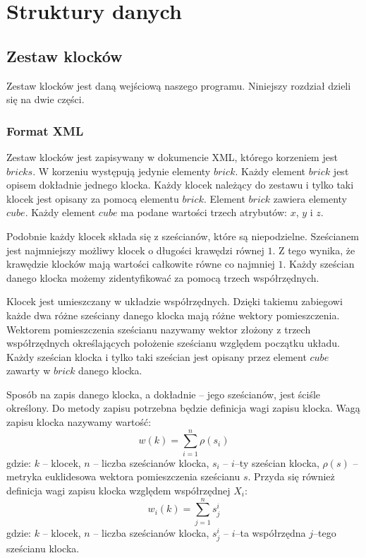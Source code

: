 \documentclass[12pt]{article}
\begin{document}
\section{Struktury danych}

\subsection{Zestaw klocków}
Zestaw klocków jest daną wejściową naszego programu. Niniejszy rozdział
dzieli się na dwie części.

\subsubsection{Format XML}\label{sec:zapis}
Zestaw klocków jest zapisywany w dokumencie XML, którego korzeniem jest
$bricks$. W korzeniu występują jedynie elementy $brick$. Każdy element
$brick$ jest opisem dokładnie jednego klocka. Każdy klocek należący do
zestawu i tylko taki klocek jest opisany za pomocą elementu $brick$.
Element $brick$ zawiera elementy $cube$. Każdy element $cube$ ma podane
wartości trzech atrybutów: $x$, $y$ i $z$.

Podobnie każdy klocek składa się
z sześcianów, które są niepodzielne. Sześcianem jest najmniejszy możliwy
klocek o długości krawędzi równej $1$. Z tego wynika, że krawędzie klocków
mają wartości całkowite równe co najmniej $1$. Każdy sześcian danego
klocka możemy zidentyfikować za pomocą trzech współrzędnych.

Klocek jest
umieszczany w układzie współrzędnych. Dzięki takiemu zabiegowi każde dwa
różne sześciany danego klocka mają różne wektory pomieszczenia. Wektorem
pomieszczenia sześcianu nazywamy wektor złożony z trzech współrzędnych
określających położenie sześcianu względem początku układu. Każdy
sześcian klocka i tylko taki sześcian jest opisany przez element $cube$
zawarty w $brick$ danego klocka.

Sposób na zapis danego klocka, a dokładnie -- jego sześcianów, jest ściśle
określony. Do metody zapisu potrzebna będzie definicja wagi zapisu klocka.
Wagą zapisu klocka nazywamy wartość:
\begin{equation}
	w(k) = \sum_{i=1}^n \rho (s_i)
\end{equation}
gdzie:
$k$ -- klocek,
$n$ -- liczba sześcianów klocka,
$s_i$ -- $i$--ty sześcian klocka,
$\rho (s)$ -- metryka euklidesowa wektora pomieszczenia sześcianu $s$.
Przyda się również definicja wagi zapisu klocka względem współrzędnej
$X_i$:
\begin{equation}
	w_i(k) = \sum_{j=1}^n s_j^i
\end{equation}
gdzie:
$k$ -- klocek,
$n$ -- liczba sześcianów klocka,
$s_j^i$ -- $i$--ta współrzędna $j$--tego sześcianu klocka.
\end{document}
